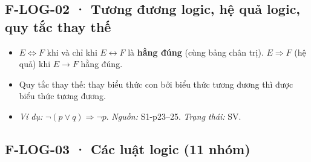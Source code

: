 \documentclass[
  10pt,
  twoside,openany]{book}
\providecommand{\tightlist}{%
  \setlength{\itemsep}{0pt}\setlength{\parskip}{0pt}}
\begin{document}
\hypertarget{F-LOG-02}{%
\subsection{F-LOG-02 · Tương đương logic, hệ quả logic, quy tắc thay
thế}\label{F-LOG-02}}

\begin{itemize}
\tightlist
\item
  \(E\Leftrightarrow F\) khi và chỉ khi \(E\leftrightarrow F\) là
  \textbf{hằng đúng} (cùng bảng chân trị). \(E\Rightarrow F\) (hệ quả)
  khi \(E\to F\) hằng đúng.
\item
  Quy tắc thay thế: thay biểu thức con bởi biểu thức tương đương thì
  được biểu thức tương đương.
\item
  \emph{Ví dụ:} \(\neg(p\vee q)\Rightarrow\neg p\). \emph{Nguồn:}
  S1-p23--25. \emph{Trạng thái:} SV.
\end{itemize}

\hypertarget{F-LOG-03}{%
\subsection{F-LOG-03 · Các luật logic (11 nhóm)}\label{F-LOG-03}}
\end{document}
